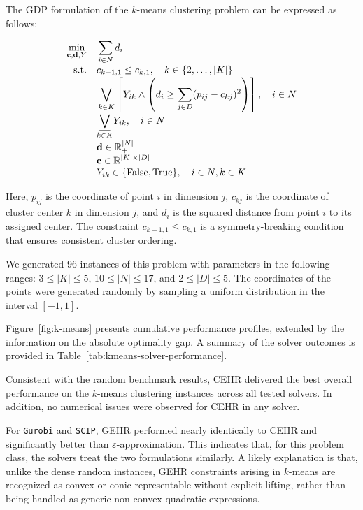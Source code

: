 \documentclass[11pt]{article}
\begin{document}
The GDP formulation of the $k$-means clustering problem can be expressed as follows:

\begingroup
\begin{equation}
\setlength{\jot}{0pt}
\begin{aligned}
\min_{\mathbf{c}, \mathbf{d}, Y} \quad & \sum_{i \in N} d_i \\
\text{s.t.} \quad & c_{k-1,1} \leq c_{k,1}, \quad k \in \{2, \ldots, |K|\} \\
& \bigvee_{k \in K} \left[ Y_{ik} \land \left( d_i \geq \sum_{j \in D} (p_{ij} - c_{kj})^2 \right) \right], \quad i \in N \\
& \underset{k \in K}{\underline{\bigvee}} Y_{ik}, \quad i \in N \\
& \mathbf{d} \in \mathbb{R}_+^{|N|} \\
& \mathbf{c} \in \mathbb{R}^{|K| \times |D|} \\
& Y_{ik} \in \{ \text{False}, \text{True} \}, \quad i \in N, k \in K
\end{aligned}
\label{eq:k-means-GDP}
\end{equation}
\endgroup



Here, \( p_{ij} \) is the coordinate of point \( i \) in dimension \( j \), \( c_{kj} \) is the coordinate of cluster center \( k \) in dimension \( j \), and \( d_i \) is the squared distance from point \( i \) to its assigned center.
The constraint \( c_{k-1,1} \leq c_{k,1} \) is a symmetry-breaking condition that ensures consistent cluster ordering.

We generated 96 instances of this problem with parameters in the following ranges: \( 3 \leq |K| \leq 5 \), \( 10 \leq |N| \leq 17 \), and \( 2 \leq |D| \leq 5 \).
The coordinates of the points were generated randomly by sampling a uniform distribution in the interval \([-1, 1]\).

Figure~\ref{fig:k-means} presents cumulative performance profiles, extended by the information on the absolute optimality gap. 
A summary of the solver outcomes is provided in Table~\ref{tab:kmeans-solver-performance}.




Consistent with the random benchmark results, CEHR delivered the best overall performance on the $k$-means clustering instances across all tested solvers.
In addition, no numerical issues were observed for CEHR in any solver.

For \texttt{Gurobi} and \texttt{SCIP}, GEHR performed nearly identically to CEHR and significantly better than $\varepsilon$-approximation.
This indicates that, for this problem class, the solvers treat the two formulations similarly.
A likely explanation is that, unlike the dense random instances, GEHR constraints arising in $k$-means are recognized as convex or conic-representable without explicit lifting, rather than being handled as generic non-convex quadratic expressions.
\end{document}
